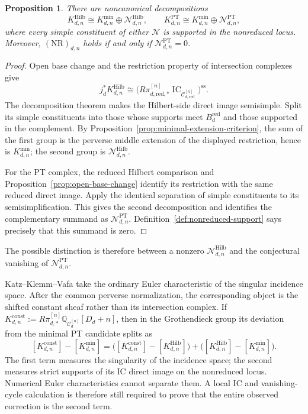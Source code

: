 \documentclass[11pt,reqno]{amsart}
\newtheorem{proposition}[theorem]{Proposition}
\theoremstyle{definition}
\newcommand{\Q}{\mathbb Q}
\newcommand{\IC}{\operatorname{IC}}
\newcommand{\Hilb}{\operatorname{Hilb}}
\newcommand{\PT}{\operatorname{PT}}
\newcommand{\red}{\mathrm{red}}
\begin{document}
\begin{proposition}\label{prop:hilbert-pt-defects}
There are noncanonical decompositions
\begin{equation}\label{eq:hilbert-pt-defects}
 K_{d,n}^{\Hilb}\cong K_{d,n}^{\min}\oplus
 \mathcal N_{d,n}^{\Hilb},
 \qquad
 K_{d,n}^{\PT}\cong K_{d,n}^{\min}\oplus
 \mathcal N_{d,n}^{\PT},
\end{equation}
where every simple constituent of either $\mathcal N$ is supported in the
nonreduced locus.  Moreover, $(\mathrm{NR})_{d,n}$ holds if and only if
$\mathcal N_{d,n}^{\PT}=0$.
\end{proposition}

\begin{proof}
Open base change and the restriction property of intersection complexes give
\[
 j_d^*K_{d,n}^{\Hilb}
 \cong
 \bigl(R\pi_{d,\red,*}^{[n]}
 \IC_{\mathcal C_{d,\red}^{[n]}}\bigr)^{\mathrm{ss}}.
\]
The decomposition theorem makes the Hilbert-side direct image semisimple.
Split its simple constituents into those whose supports meet
$B_d^{\red}$ and those supported in the complement.  By
Proposition~\ref{prop:minimal-extension-criterion}, the sum of the first
group is the perverse middle extension of the displayed restriction, hence
is $K_{d,n}^{\min}$; the second group is
$\mathcal N_{d,n}^{\Hilb}$.

For the PT complex, the reduced Hilbert comparison and
Proposition~\ref{prop:open-base-change} identify its restriction with the
same reduced direct image.  Apply the identical separation of simple
constituents to its semisimplification.  This gives the second decomposition
and identifies the complementary summand as $\mathcal N_{d,n}^{\PT}$.
Definition~\ref{def:nonreduced-support} says precisely that this summand is
zero.
\end{proof}

The possible distinction is therefore between a nonzero
$\mathcal N_{d,n}^{\Hilb}$ and the conjectural vanishing of
$\mathcal N_{d,n}^{\PT}$.

Katz--Klemm--Vafa take the ordinary Euler characteristic of the singular
incidence space.  After the common perverse normalization, the corresponding
object is the shifted constant sheaf rather than its intersection complex.
If
$K_{d,n}^{\mathrm{const}}:=R\pi_{d,*}^{[n]}
\Q_{\mathcal C_d^{[n]}}[D_d+n]$, then in the
Grothendieck group its deviation from the minimal PT candidate splits as
\begin{equation}\label{eq:constant-ic-pt-defect}
 [K_{d,n}^{\mathrm{const}}]-[K_{d,n}^{\min}]
 =\bigl([K_{d,n}^{\mathrm{const}}]-[K_{d,n}^{\Hilb}]\bigr)
  +\bigl([K_{d,n}^{\Hilb}]-[K_{d,n}^{\min}]\bigr).
\end{equation}
The first term measures the singularity of the incidence space; the second
measures strict supports of its IC direct image on the nonreduced locus.
Numerical Euler characteristics cannot separate them.  A local IC and
vanishing-cycle calculation is therefore still required to prove that the
entire observed correction is the second term.
\end{document}
